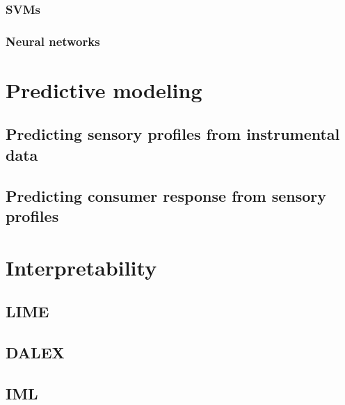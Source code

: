 \documentclass[
]{book}
\begin{document}
\hypertarget{svms}{%
\subsubsection{SVMs}\label{svms}}

\hypertarget{neural-networks}{%
\subsubsection{Neural networks}\label{neural-networks}}

\hypertarget{predictive-modeling}{%
\section{Predictive modeling}\label{predictive-modeling}}

\hypertarget{predicting-sensory-profiles-from-instrumental-data}{%
\subsection{Predicting sensory profiles from instrumental data}\label{predicting-sensory-profiles-from-instrumental-data}}

\hypertarget{predicting-consumer-response-from-sensory-profiles}{%
\subsection{Predicting consumer response from sensory profiles}\label{predicting-consumer-response-from-sensory-profiles}}

\hypertarget{interpretability}{%
\section{Interpretability}\label{interpretability}}

\hypertarget{lime}{%
\subsection{LIME}\label{lime}}

\hypertarget{dalex}{%
\subsection{DALEX}\label{dalex}}

\hypertarget{iml}{%
\subsection{IML}\label{iml}}
\end{document}
